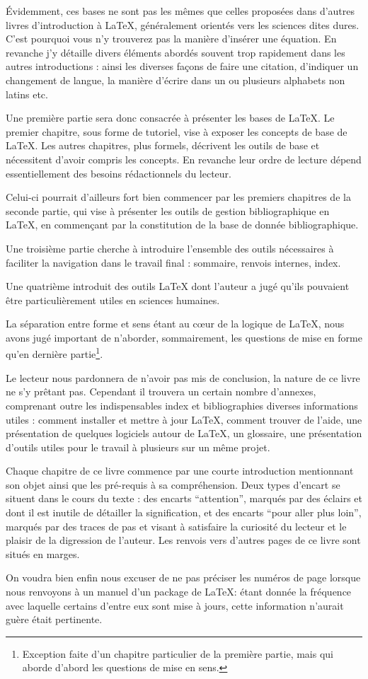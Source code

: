 Évidemment, ces bases ne sont pas les mêmes que celles proposées dans d'autres livres d'introduction à \LaTeX{}, généralement orientés vers les sciences dites dures. 
C'est pourquoi vous n'y trouverez pas la manière d'insérer une équation. En revanche j'y détaille divers éléments abordés souvent trop rapidement dans les autres introductions : ainsi les diverses façons de faire une citation, d'indiquer un changement de langue, la manière d'écrire dans un ou plusieurs alphabets non latins etc.

Une première partie sera donc consacrée à présenter les bases de \LaTeX. Le premier chapitre, sous forme de tutoriel, vise à exposer les concepts de base de \LaTeX. Les autres chapitres, plus formels, décrivent les outils de base et nécessitent d'avoir compris les concepts. En revanche leur ordre de lecture dépend essentiellement des besoins rédactionnels du lecteur. 

Celui-ci pourrait d'ailleurs fort bien commencer par les premiers chapitres de la seconde partie, qui vise à présenter les outils de gestion bibliographique en \LaTeX{}, en commençant par la constitution de la base de donnée bibliographique.

Une troisième partie cherche à introduire l'ensemble des outils nécessaires à faciliter la navigation dans le travail final : sommaire, renvois internes, index.

Une quatrième introduit des outils \LaTeX{} dont l'auteur a jugé qu'ils pouvaient être particulièrement utiles en sciences humaines.

La séparation entre forme et sens étant au cœur de la logique de \LaTeX{}, nous avons jugé important  de n'aborder, sommairement,  les questions de mise en forme qu'en dernière partie\footnote{Exception faite d'un chapitre particulier de la première partie, mais qui aborde d'abord les questions de mise en sens.}.

Le lecteur nous pardonnera de n'avoir pas mis de conclusion, la nature de ce livre ne s'y prêtant pas. Cependant il trouvera un certain nombre d'annexes, comprenant outre les indispensables index et bibliographies diverses informations utiles : comment installer et mettre à jour  \LaTeX{}, comment trouver de l'aide, une présentation de quelques logiciels autour de \LaTeX{}, un glossaire, une présentation d'outils utiles pour le travail à plusieurs sur un même projet.

Chaque chapitre de ce livre commence par une courte introduction mentionnant son objet ainsi que les pré-requis à sa compréhension. Deux types d'encart se situent dans le cours du texte : des encarts \enquote{attention}, marqués par des éclairs et dont il est inutile de détailler la signification, et des encarts \enquote{pour aller plus loin}, marqués par des traces de pas et visant à satisfaire la curiosité du lecteur et le plaisir de la digression de l'auteur. Les renvois vers d'autres pages de ce livre sont situés en marges.

On voudra bien enfin nous excuser de ne pas préciser les numéros de page lorsque nous renvoyons à un manuel d'un package de \LaTeX : étant donnée la fréquence avec laquelle certains d'entre eux sont mise à jours, cette information n'aurait guère était pertinente.

